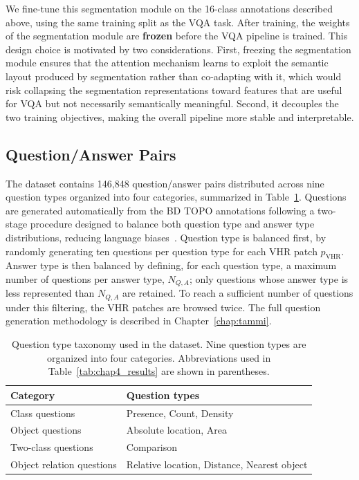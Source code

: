 We fine-tune this segmentation module on the 16-class
annotations described above, using the same training split
as the VQA task. After training, the weights of the
segmentation module are \textbf{frozen} before the VQA
pipeline is trained. This design choice is motivated by two
considerations. First, freezing the segmentation module
ensures that the attention mechanism learns to exploit the
semantic layout produced by segmentation rather than
co-adapting with it, which would risk collapsing the
segmentation representations toward features that are
useful for VQA but not necessarily semantically meaningful.
Second, it decouples the two training objectives, making
the overall pipeline more stable and interpretable.

\subsection{Question/Answer Pairs}
\label{sec:chap4_dataset_qa}

The dataset contains 146,848 question/answer pairs
distributed across nine question types organized into
four categories, summarized in Table~\ref{tab:chap4_qtypes}.
Questions are generated automatically from the BD TOPO
annotations following a two-stage procedure designed to
balance both question type and answer type distributions,
reducing language biases~\cite{chappuis2025langbias}. Question
type is balanced first, by randomly generating ten questions
per question type for each VHR patch $p_\text{VHR}$. Answer
type is then balanced by defining, for each question type, a
maximum number of questions per answer type, $N_{Q,A}$; only
questions whose answer type is less represented than
$N_{Q,A}$ are retained. To reach a sufficient number of
questions under this filtering, the VHR patches are browsed
twice. The full
question generation methodology is described in
Chapter~\ref{chap:tammi}.

\begin{table}[ht]
\centering
\small
\caption{Question type taxonomy used in the dataset.
Nine question types are organized into four categories.
Abbreviations used in Table~\ref{tab:chap4_results}
are shown in parentheses.}
\label{tab:chap4_qtypes}
\begin{tabularx}{\textwidth}{l >{\raggedright\arraybackslash}X}
\toprule
\textbf{Category} & \textbf{Question types} \\
\midrule
Class questions & Presence, Count, Density \\
Object questions & Absolute location, Area \\
Two-class questions & Comparison \\
Object relation questions & Relative location, Distance,
                            Nearest object \\
\bottomrule
\end{tabularx}
\end{table}

